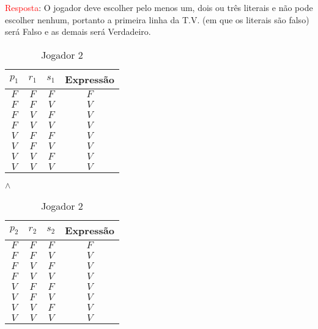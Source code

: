 \documentclass[a4paper,12pt]{article}
\begin{document}
\begin{enumerate}
\begin{enumerate}
 \textcolor{red}{Resposta}: O jogador deve escolher pelo menos um, dois ou três literais e não pode escolher nenhum, portanto a primeira linha da T.V. (em que os literais são falso) será Falso e as demais será Verdadeiro.
 \begin{table}[htb]
 \begin{center}
 \begin{minipage}{0.4\linewidth}
 \centering
 \begin{tabular}{|c|c|c|c|}
     \hline
  \rowcolor[rgb]{0.9,0.9,0.9} { $p_1$} & { $r_1$} & { $s_1$} & {\bf Expressão} \\ \hline
  \rowcolor[rgb]{1,0.2,0.2}  $F$   & $F$   & $F$   & $F$ \\ \hline
   $F$   & $F$   & $V$   & $V$ \\ \hline
   $F$   & $V$   & $F$   & $V$ \\ \hline
   $F$   & $V$   & $V$   & $V$ \\ \hline
   $V$   & $F$   & $F$   & $V$ \\ \hline
   $V$   & $F$   & $V$   & $V$ \\ \hline
   $V$   & $V$   & $F$   & $V$ \\ \hline
   $V$   & $V$   & $V$   & $V$ \\ \hline
 \end{tabular}
 \caption{Jogador 1}
 \label{4a1}
 \end{minipage}
 $\wedge$
 \begin{minipage}{0.4\linewidth}
 \centering
 \begin{tabular}{|c|c|c|c|}
     \hline
  \rowcolor[rgb]{0.9,0.9,0.9} { $p_2$} & { $r_2$} & { $s_2$} & {\bf Expressão} \\ \hline
  \rowcolor[rgb]{1,0.2,0.2}  $F$   & $F$   & $F$   & $F$ \\ \hline
   $F$   & $F$   & $V$   & $V$ \\ \hline
   $F$   & $V$   & $F$   & $V$ \\ \hline
   $F$   & $V$   & $V$   & $V$ \\ \hline
   $V$   & $F$   & $F$   & $V$ \\ \hline
   $V$   & $F$   & $V$   & $V$ \\ \hline
   $V$   & $V$   & $F$   & $V$ \\ \hline
   $V$   & $V$   & $V$   & $V$ \\ \hline
 \end{tabular}
 \caption{Jogador 2}
 \label{4a2}
 \end{minipage}
 \end{center}
 \end{table}
 

\end{enumerate}
\end{enumerate}
\end{document}
